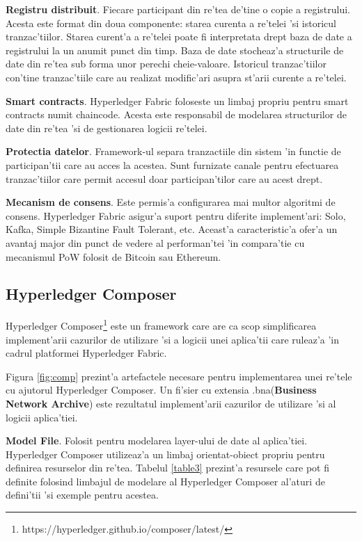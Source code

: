 \documentclass[12pt,a4paper,twoside]{report}
\begin{document}
\textbf{Registru distribuit}. Fiecare participant din re'tea de'tine o copie a registrului. Acesta este format din doua componente: starea curenta a re'telei 'si istoricul tranzac'tiilor. Starea curent'a a re'telei poate fi interpretata drept baza de date a registrului la un anumit punct din timp. Baza de date stocheaz'a structurile de date din re'tea sub forma unor perechi cheie-valoare. Istoricul tranzac'tiilor con'tine tranzac'tiile care au realizat modific'ari asupra st'arii curente a re'telei. 

\textbf{Smart contracts}. Hyperledger Fabric foloseste un limbaj propriu pentru smart contracts numit chaincode. Acesta este responsabil de modelarea structurilor de date din re'tea 'si de gestionarea logicii re'telei.

\textbf{Protectia datelor}. Framework-ul separa tranzactiile din sistem 'in functie de participan'tii care au acces la acestea. Sunt furnizate canale pentru efectuarea tranzac'tiilor care permit accesul doar participan'tilor care au acest drept.

\textbf{Mecanism de consens}. Este permis'a configurarea mai multor algoritmi de consens. Hyperledger Fabric asigur'a suport pentru diferite implement'ari: Solo, Kafka, Simple Bizantine Fault Tolerant, etc\cite{fabricdoc}. Aceast'a caracteristic'a ofer'a un avantaj major din punct de vedere al performan'tei 'in compara'tie cu mecanismul PoW folosit de Bitcoin sau Ethereum.

\subsection{Hyperledger Composer}
Hyperledger Composer\footnote{https://hyperledger.github.io/composer/latest/} este un framework care are ca scop simplificarea implement'arii cazurilor de utilizare 'si a logicii unei aplica'tii care ruleaz'a 'in cadrul platformei Hyperledger Fabric.

Figura \ref{fig:comp} prezint'a artefactele necesare pentru implementarea unei re'tele cu ajutorul Hyperledger Composer. Un fi'sier cu extensia .bna(\textbf{Business Network Archive}) este rezultatul implement'arii cazurilor de utilizare 'si al logicii aplica'tiei.

\textbf{Model File}. Folosit pentru modelarea layer-ului de date al aplica'tiei. Hyperledger Composer utilizeaz'a un limbaj orientat-obiect propriu pentru definirea resurselor din re'tea. Tabelul \ref{table3} prezint'a resursele care pot fi definite folosind limbajul de modelare al Hyperledger Composer al'aturi de defini'tii 'si exemple pentru acestea.
\end{document}
